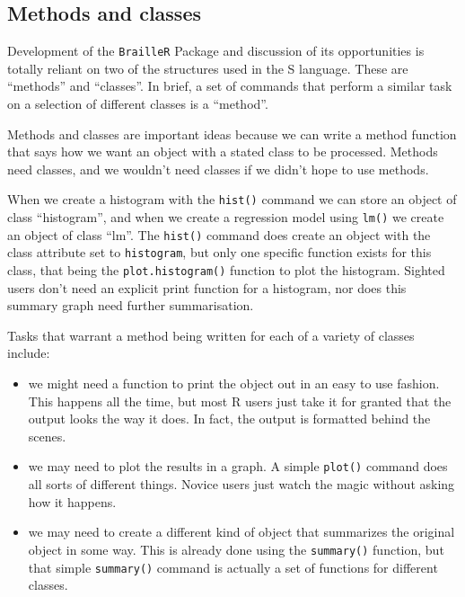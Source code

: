 \documentclass[
]{book}
\providecommand{\tightlist}{%
  \setlength{\itemsep}{0pt}\setlength{\parskip}{0pt}}
\begin{document}
\hypertarget{methods-and-classes}{%
\subsection{Methods and classes}\label{methods-and-classes}}

Development of the \texttt{BrailleR} Package and discussion of its opportunities is totally reliant on two of the structures used in the S language.
These are ``methods'' and ``classes''.
In brief, a set of commands that perform a similar task on a selection of different classes is a ``method''.

Methods and classes are important ideas because we can write a method function that says how we want an object with a stated class to be processed. Methods need classes, and we wouldn't need classes if we didn't hope to use methods.

When we create a histogram with the \texttt{hist()} command we can store an object of class ``histogram'', and when we create a regression model using \texttt{lm()} we create an object of class ``lm''.
The \texttt{hist()} command does create an object with the class attribute set to \texttt{histogram}, but only one specific function exists for this class, that being the \texttt{plot.histogram()} function to plot the histogram.
Sighted users don't need an explicit print function for a histogram, nor does this summary graph need further summarisation.

Tasks that warrant a method being written for each of a variety of classes include:

\begin{itemize}
\tightlist
\item
  we might need a function to print the object out in an easy to use fashion. This happens all the time, but most R users just take it for granted that the output looks the way it does. In fact, the output is formatted behind the scenes.
\item
  we may need to plot the results in a graph. A simple \texttt{plot()} command does all sorts of different things. Novice users just watch the magic without asking how it happens.
\item
  we may need to create a different kind of object that summarizes the original object in some way. This is already done using the \texttt{summary()} function, but that simple \texttt{summary()} command is actually a set of functions for different classes.
\end{itemize}
\end{document}
